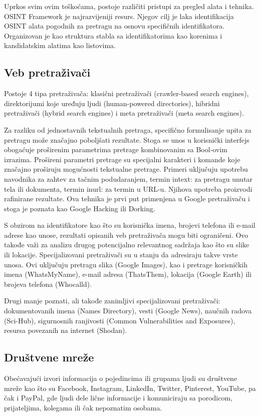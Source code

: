 \documentclass[a4paper, 11pt]{article}
\begin{document}
Uprkos svim ovim teškoćama, postoje različiti pristupi za pregled alata i tehnika. OSINT Framework je najrazvijeniji resurs. Njegov cilj je laka identifikacija OSINT alata pogodnih za pretragu na osnovu specifičnih identifikatora. Organizovan je kao struktura stabla sa identifikatorima kao korenima i kandidatskim alatima kao listovima.
\subsection{Veb pretraživači}
Postoje 4 tipa pretraživača: klasični pretraživači (crawler-based search engines), direktorijumi koje uređuju ljudi (human-powered directories), hibridni pretraživači (hybrid search engines) i meta pretraživači (meta search engines).\newline

Za razliku od jednostavnih tekstualnih pretraga, specifično formulisanje upita za pretragu može značajno poboljšati rezultate. Stoga se unos u korisnički interfejs obogaćuje proširenim parametrima pretrage kombinovanim sa Bool-ovim izrazima. Prošireni parametri pretrage su specijalni karakteri i komande koje značajno proširuju mogućnosti tekstualne pretrage. Primeri uključuju upotrebu navodnika za zahtev za tačnim podudaranjem, termin intext: za pretragu unutar tela ili dokumenta, termin inurl: za termin u URL-u. Njihova upotreba proizvodi rafinirane rezultate. Ova tehnika je prvi put primenjena u Google pretraživaču i stoga je poznata kao Google Hacking ili Dorking.\newline

S obzirom na identifikatore kao što su korisnička imena, brojevi telefona ili e-mail adrese kao unose, rezultati opisanih veb pretraživača mogu biti ograničeni. Ovo takođe važi za analizu drugog potencijalno relevantnog sadržaja kao što su slike ili lokacije. Specijalizovani pretraživači su u stanju da adresiraju takve vrste unosa. Ovi uključuju pretragu slika (Google Images), kao i pretrage korisničkih imena (WhatsMyName), e-mail adresa (ThatsThem), lokacija (Google Earth) ili brojeva telefona (Whocalld).\newline

Drugi manje poznati, ali takođe zanimljivi specijalizovani pretraživači: dokumentovanih imena (Names Directory), vesti (Google News), naučnih radova (Sci-Hub), sigurnosnih ranjivosti (Common Vulnerabilities and Exposures), resursa povezanih na internet (Shodan).
\subsection{Društvene mreže}
Obećavajući izvori informacija o pojedincima ili grupama ljudi su društvene mreže kao što su Facebook, Instagram, LinkedIn, Twitter, Pinterest, YouTube, pa čak i PayPal, gde ljudi dele lične informacije i komuniciraju sa porodicom, prijateljima, kolegama ili čak nepoznatim osobama.\newline
\end{document}
